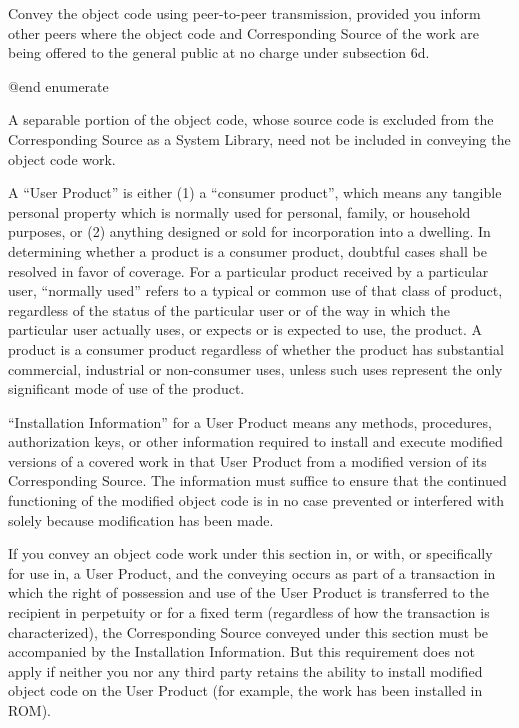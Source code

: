 \item
Convey the object code using peer-to-peer transmission, provided you
inform other peers where the object code and Corresponding Source of
the work are being offered to the general public at no charge under
subsection 6d.

@end enumerate

A separable portion of the object code, whose source code is excluded
from the Corresponding Source as a System Library, need not be
included in conveying the object code work.

A ``User Product'' is either (1) a ``consumer product'', which means any
tangible personal property which is normally used for personal,
family, or household purposes, or (2) anything designed or sold for
incorporation into a dwelling.  In determining whether a product is a
consumer product, doubtful cases shall be resolved in favor of
coverage.  For a particular product received by a particular user,
``normally used'' refers to a typical or common use of that class of
product, regardless of the status of the particular user or of the way
in which the particular user actually uses, or expects or is expected
to use, the product.  A product is a consumer product regardless of
whether the product has substantial commercial, industrial or
non-consumer uses, unless such uses represent the only significant
mode of use of the product.

``Installation Information'' for a User Product means any methods,
procedures, authorization keys, or other information required to
install and execute modified versions of a covered work in that User
Product from a modified version of its Corresponding Source.  The
information must suffice to ensure that the continued functioning of
the modified object code is in no case prevented or interfered with
solely because modification has been made.

If you convey an object code work under this section in, or with, or
specifically for use in, a User Product, and the conveying occurs as
part of a transaction in which the right of possession and use of the
User Product is transferred to the recipient in perpetuity or for a
fixed term (regardless of how the transaction is characterized), the
Corresponding Source conveyed under this section must be accompanied
by the Installation Information.  But this requirement does not apply
if neither you nor any third party retains the ability to install
modified object code on the User Product (for example, the work has
been installed in ROM).

